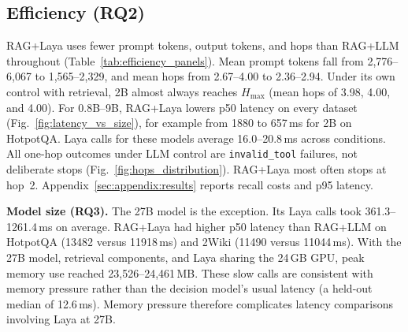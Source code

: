 \subsection{Efficiency (RQ2)}
\label{sec:exp:efficiency}


\begin{figure}[t]
  \hfill
\end{figure}

RAG+Laya uses fewer prompt tokens, output tokens, and hops than RAG+LLM throughout
(Table~\ref{tab:efficiency_panels}). Mean prompt tokens fall from 2{,}776--6{,}067
to 1{,}565--2{,}329, and mean hops from 2.67--4.00 to 2.36--2.94. Under its own
control with retrieval, 2B almost always reaches $H_{\max}$ (mean hops of 3.98, 4.00,
and 4.00). For 0.8B--9B, RAG+Laya lowers p50 latency on every dataset
(Fig.~\ref{fig:latency_vs_size}), for example from 1880 to 657\,ms for 2B on HotpotQA.
Laya calls for these models average 16.0--20.8\,ms across conditions. All one-hop
outcomes under LLM control are \texttt{invalid\_tool} failures, not deliberate stops
(Fig.~\ref{fig:hops_distribution}). RAG+Laya most often stops at hop~2.
Appendix~\ref{sec:appendix:results} reports recall costs and p95 latency.

\textbf{Model size (RQ3).} The 27B model is the exception. Its Laya calls took
361.3--1261.4\,ms on average. RAG+Laya had higher p50 latency than RAG+LLM on HotpotQA
(13482 versus 11918\,ms) and 2Wiki (11490 versus 11044\,ms). With the 27B model,
retrieval components, and Laya sharing the 24\,GB GPU, peak memory use reached
23{,}526--24{,}461\,MB. These slow calls are consistent with memory pressure rather
than the decision model's usual latency (a held-out median of 12.6\,ms). Memory
pressure therefore complicates latency comparisons involving Laya at 27B.

